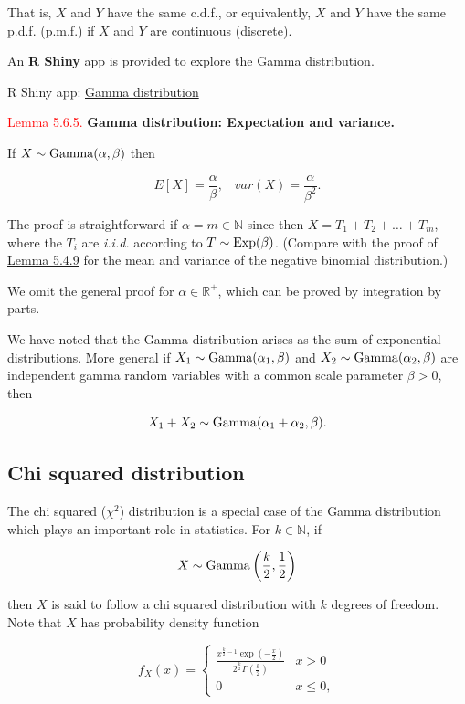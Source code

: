 \documentclass[
]{book}
\begin{document}
That is, \(X\) and \(Y\) have the same c.d.f., or equivalently, \(X\) and \(Y\) have the same p.d.f. (p.m.f.) if \(X\) and \(Y\) are continuous (discrete).

An \textbf{R Shiny} app is provided to explore the Gamma distribution.

R Shiny app: \href{https://shiny-new.maths.nottingham.ac.uk/pmzpn/Gamma/}{Gamma distribution}

\leavevmode{}%
\textcolor{red}{Lemma 5.6.5.}
{\textbf{Gamma distribution: Expectation and variance.}}

If \(X \sim {\rm Gamma} (\alpha, \beta)\) then

\[
E[X] = \frac{\alpha}{\beta}, \; \; \; var(X) = \frac{\alpha}{\beta^{2}}.
\]

The proof is straightforward if \(\alpha =m \in \mathbb{N}\) since then \(X= T_1 +T_2 + \ldots +T_m\), where the \(T_i\) are \emph{i.i.d.} according to \(T \sim {\rm Exp} (\beta)\). (Compare with the proof of \protect\hyperlink{rv:lem:neg_binom_expectation}{Lemma 5.4.9} for the mean and variance of the negative binomial distribution.)

We omit the general proof for \(\alpha \in \mathbb{R}^+\), which can be proved by integration by parts.

We have noted that the Gamma distribution arises as the sum of exponential distributions. More general if \(X_1 \sim {\rm Gamma} (\alpha_1, \beta)\) and \(X_2 \sim {\rm Gamma} (\alpha_2, \beta)\) are independent gamma random variables with a common scale parameter \(\beta >0\), then

\[
X_1 + X_2 \sim {\rm Gamma} (\alpha_1 + \alpha_2, \beta).
\]

\hypertarget{rv:exponential:chi}{%
\subsection{Chi squared distribution}\label{rv:exponential:chi}}

The chi squared (\(\chi^2\)) distribution is a special case of the Gamma distribution which plays an important role in statistics. For \(k \in \mathbb{N}\), if

\[ X \sim {\rm Gamma} \left(\frac{k}{2}, \frac{1}{2} \right) \]

then \(X\) is said to follow a chi squared distribution with \(k\) degrees of freedom. Note that \(X\) has probability density function

\[ f_X (x) = \left\{ \begin{array}{ll} \frac{x^{\frac{k}{2}-1} \exp\left(-\frac{x}{2}\right)}{2^{\frac{k}{2}} \Gamma \left( \frac{k}{2}\right)} & x>0 \\
0 & x \leq 0, \end{array} \right. \]
\end{document}
